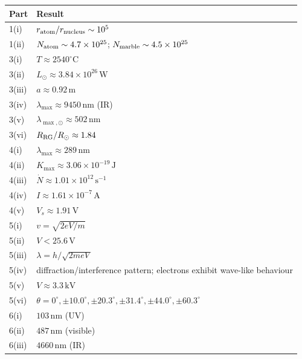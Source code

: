 \documentclass[11pt,a4paper]{article}
\begin{document}
\begin{center}
\begin{tabular}{ll}
\toprule
\textbf{Part} & \textbf{Result}\\
\midrule
1(i) & $r_{\rm atom}/r_{\rm nucleus}\sim10^5$\\
1(ii) & $N_{\rm atom}\sim4.7\times10^{25}$; $N_{\rm marble}\sim4.5\times10^{25}$\\
3(i) & $T\approx2540^\circ\mathrm C$\\
3(ii) & $L_\odot\approx3.84\times10^{26}\,\mathrm W$\\
3(iii) & $a\approx0.92\,\mathrm m$\\
3(iv) & $\lambda_{\max}\approx9450\,\mathrm{nm}$ (IR)\\
3(v) & $\lambda_{\max,\odot}\approx502\,\mathrm{nm}$\\
3(vi) & $R_{\rm RG}/R_\odot\approx1.84$\\
4(i) & $\lambda_{\max}\approx289\,\mathrm{nm}$\\
4(ii) & $K_{\max}\approx3.06\times10^{-19}\,\mathrm J$\\
4(iii) & $\dot N\approx1.01\times10^{12}\,\mathrm{s^{-1}}$\\
4(iv) & $I\approx1.61\times10^{-7}\,\mathrm A$\\
4(v) & $V_s\approx1.91\,\mathrm V$\\
5(i) & $v=\sqrt{2eV/m}$\\
5(ii) & $V<25.6\,\mathrm V$\\
5(iii) & $\lambda=h/\sqrt{2meV}$\\
5(iv) & diffraction/interference pattern; electrons exhibit wave-like behaviour\\
5(v) & $V\approx3.3\,\mathrm{kV}$\\
5(vi) & $\theta=0^\circ,\pm10.0^\circ,\pm20.3^\circ,\pm31.4^\circ,\pm44.0^\circ,\pm60.3^\circ$\\
6(i) & $103\,\mathrm{nm}$ (UV)\\
6(ii) & $487\,\mathrm{nm}$ (visible)\\
6(iii) & $4660\,\mathrm{nm}$ (IR)\\
\bottomrule
\end{tabular}
\end{center}
\end{document}

